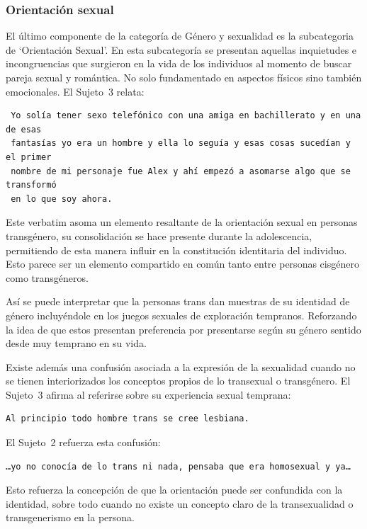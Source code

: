 \subsubsection{Orientación sexual}

El último componente de la categoría de Género y sexualidad es la subcategoria
de ‘Orientación Sexual’. En esta subcategoría se presentan aquellas inquietudes
e incongruencias que surgieron en la vida de los individuos al momento de buscar
pareja sexual y romántica. No solo fundamentado en aspectos físicos sino también
emocionales. El Sujeto~3 relata:

\begin{verbatim}
 Yo solía tener sexo telefónico con una amiga en bachillerato y en una de esas
 fantasías yo era un hombre y ella lo seguía y esas cosas sucedían y el primer
 nombre de mi personaje fue Alex y ahí empezó a asomarse algo que se transformó
 en lo que soy ahora.
\end{verbatim}

Este verbatim asoma un elemento resaltante de la orientación sexual en personas
transgénero, su consolidación se hace presente durante la adolescencia,
permitiendo de esta manera influir en la constitución identitaria del individuo.
Esto parece ser un elemento compartido en común tanto entre personas cisgénero
como transgéneros.

Así se puede interpretar que la personas trans dan muestras de su identidad de
género incluyéndole en los juegos sexuales de exploración tempranos. Reforzando
la idea de que estos presentan preferencia por presentarse según su género
sentido desde muy temprano en su vida.

Existe además una confusión asociada a la expresión de la sexualidad cuando no
se tienen interiorizados los conceptos propios de lo transexual o transgénero.
El Sujeto~3 afirma al referirse sobre su experiencia sexual temprana:

\begin{verbatim}
Al principio todo hombre trans se cree lesbiana.
\end{verbatim}

El Sujeto~2 refuerza esta confusión:

\begin{verbatim}
…yo no conocía de lo trans ni nada, pensaba que era homosexual y ya…
\end{verbatim}

Esto refuerza la concepción de que la orientación puede ser confundida con la
identidad, sobre todo cuando no existe un concepto claro de la transexualidad o
transgenerismo en la persona.

